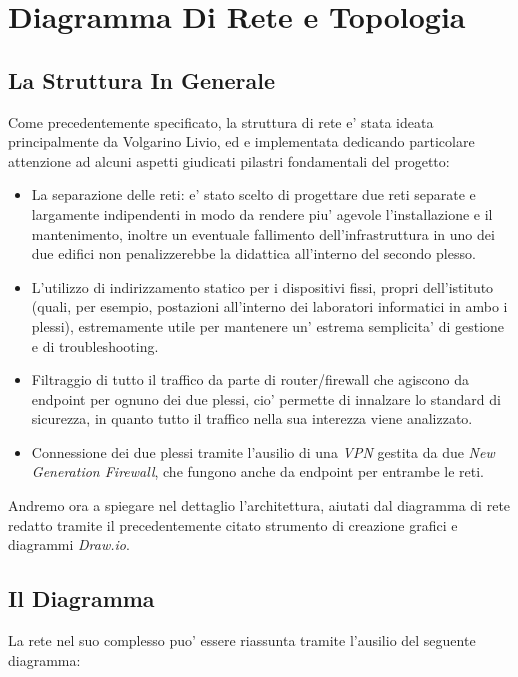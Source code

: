 \documentclass{report}
\begin{document}
    \chapter{Diagramma Di Rete e Topologia}
    \begin{sloppypar}
        \author{Volgarino Livio}
        \section{La Struttura In Generale}
        Come precedentemente specificato, la struttura di rete e' stata ideata principalmente da Volgarino Livio, ed e
         implementata dedicando particolare attenzione ad alcuni aspetti giudicati pilastri fondamentali del progetto:
         \begin{itemize}
             \item La separazione delle reti: e' stato scelto di progettare due reti separate e largamente indipendenti
              in modo da rendere piu' agevole l'installazione e il mantenimento, inoltre un eventuale fallimento
              dell'infrastruttura in uno dei due edifici non penalizzerebbe la didattica all'interno del secondo plesso.
             \item L'utilizzo di indirizzamento statico per i dispositivi fissi, propri dell'istituto (quali, per esempio,
              postazioni all'interno dei laboratori informatici in ambo i plessi), estremamente utile per mantenere un'
              estrema semplicita' di gestione e di troubleshooting.
             \item Filtraggio di tutto il traffico da parte di router/firewall che agiscono da endpoint per ognuno dei due
              plessi, cio' permette di innalzare lo standard di sicurezza, in quanto tutto il traffico nella sua interezza
              viene analizzato.
             \item Connessione dei due plessi tramite l'ausilio di una \emph{VPN} gestita da due \emph{New Generation
             Firewall}, che fungono anche da endpoint per entrambe le reti.
         \end{itemize}
        Andremo ora a spiegare nel dettaglio l'architettura, aiutati dal diagramma di rete redatto tramite il precedentemente
         citato strumento di creazione grafici e diagrammi \emph{Draw.io}.
        \section{Il Diagramma}
        La rete nel suo complesso puo' essere riassunta tramite l'ausilio del seguente diagramma:


\end{sloppypar}
\end{document}
